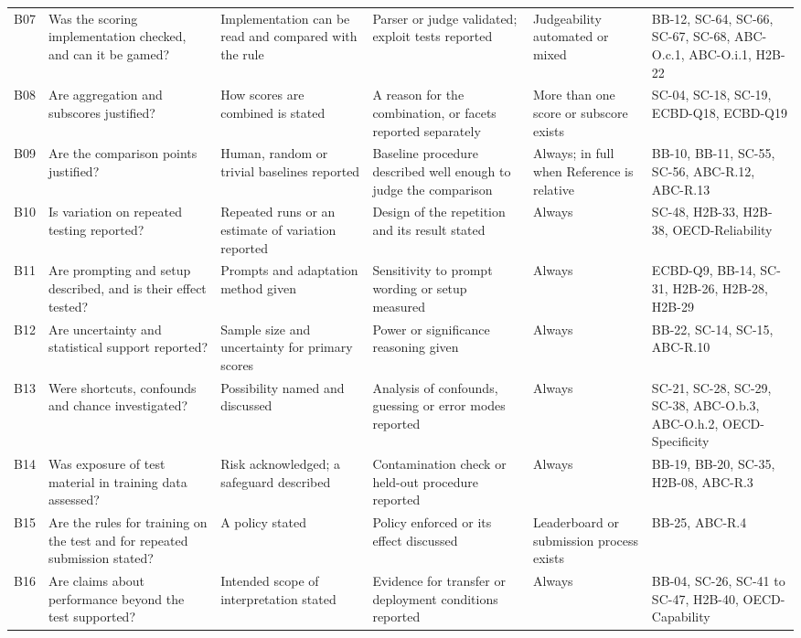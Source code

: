 \documentclass[10pt,conference]{IEEEtran}
\begin{document}
\begin{table}[t]
\begin{tabularx}{\textwidth}{@{}lXXXXl@{}}
B07 & Was the scoring implementation checked, and can it be gamed? & Implementation can be read and compared with the rule & Parser or judge validated; exploit tests reported & Judgeability automated or mixed & BB-12, SC-64, SC-66, SC-67, SC-68, ABC-O.c.1, ABC-O.i.1, H2B-22 \\
B08 & Are aggregation and subscores justified? & How scores are combined is stated & A reason for the combination, or facets reported separately & More than one score or subscore exists & SC-04, SC-18, SC-19, ECBD-Q18, ECBD-Q19 \\
B09 & Are the comparison points justified? & Human, random or trivial baselines reported & Baseline procedure described well enough to judge the comparison & Always; in full when Reference is relative & BB-10, BB-11, SC-55, SC-56, ABC-R.12, ABC-R.13 \\
B10 & Is variation on repeated testing reported? & Repeated runs or an estimate of variation reported & Design of the repetition and its result stated & Always & SC-48, H2B-33, H2B-38, OECD-Reliability \\
B11 & Are prompting and setup described, and is their effect tested? & Prompts and adaptation method given & Sensitivity to prompt wording or setup measured & Always & ECBD-Q9, BB-14, SC-31, H2B-26, H2B-28, H2B-29 \\
B12 & Are uncertainty and statistical support reported? & Sample size and uncertainty for primary scores & Power or significance reasoning given & Always & BB-22, SC-14, SC-15, ABC-R.10 \\
B13 & Were shortcuts, confounds and chance investigated? & Possibility named and discussed & Analysis of confounds, guessing or error modes reported & Always & SC-21, SC-28, SC-29, SC-38, ABC-O.b.3, ABC-O.h.2, OECD-Specificity \\
B14 & Was exposure of test material in training data assessed? & Risk acknowledged; a safeguard described & Contamination check or held-out procedure reported & Always & BB-19, BB-20, SC-35, H2B-08, ABC-R.3 \\
B15 & Are the rules for training on the test and for repeated submission stated? & A policy stated & Policy enforced or its effect discussed & Leaderboard or submission process exists & BB-25, ABC-R.4 \\
B16 & Are claims about performance beyond the test supported? & Intended scope of interpretation stated & Evidence for transfer or deployment conditions reported & Always & BB-04, SC-26, SC-41 to SC-47, H2B-40, OECD-Capability \\

\end{tabularx}
\end{table}
\end{document}
